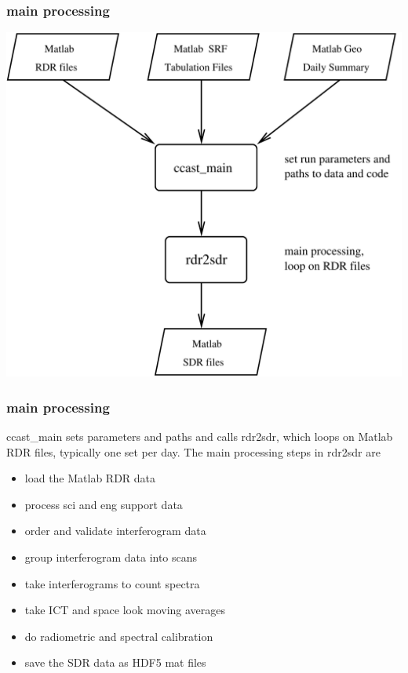 \documentclass[11pt]{beamer}
\begin{document}
\begin{frame}
\frametitle{main processing}

\begin{center}
  \includegraphics[scale=0.4]{figures/mainpro.pdf}
\end{center}

\end{frame}
\begin{frame}
\frametitle{main processing}

ccast\_main sets parameters and paths and calls rdr2sdr, which loops
on Matlab RDR files, typically one set per day.  The main processing
steps in rdr2sdr are

\begin{itemize}
  \item load the Matlab RDR data
  \item process sci and eng support data
  \item order and validate interferogram data
  \item group interferogram data into scans
  \item take interferograms to count spectra
  \item take ICT and space look moving averages
  \item do radiometric and spectral calibration
  \item save the SDR data as HDF5 mat files
\end{itemize}

\end{frame}
\end{document}

